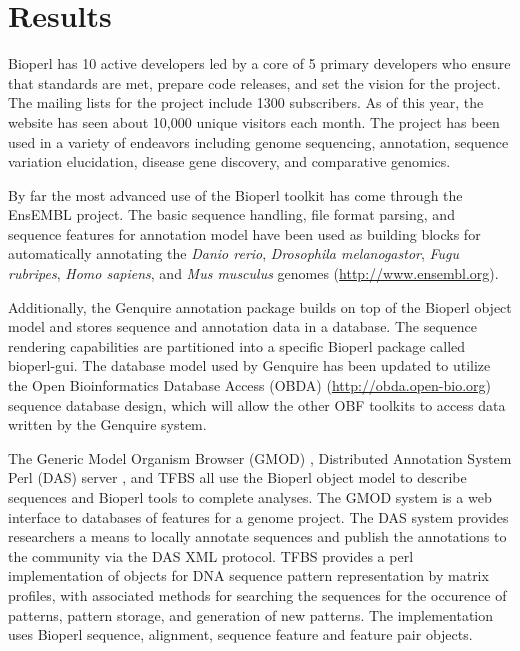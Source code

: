 \documentclass[12pt]{article}
\begin{document}
\section{Results}

Bioperl has 10 active developers led by a core of 5 primary developers
who ensure that standards are met, prepare code releases, and set the
vision for the project.  The mailing lists for the project include
1300 subscribers. As of this year, the website has seen about 10,000
unique visitors each month.  The project has been used in a variety of
endeavors including genome sequencing, annotation, sequence variation
elucidation, disease gene discovery, and comparative genomics.

By far the most advanced use of the Bioperl toolkit has come through
the EnsEMBL\cite{ensembl-nar} project.  The basic sequence handling,
file format parsing, and sequence features for annotation model have
been used as building blocks for automatically annotating the
\textit{Danio rerio}, \textit{Drosophila melanogastor}, \textit{Fugu
rubripes}, \textit{Homo sapiens}, and \textit{Mus musculus} genomes
(\url{http://www.ensembl.org}).

Additionally, the Genquire\cite{genquire} annotation package builds on
top of the Bioperl object model and stores sequence and annotation
data in a database.  The sequence rendering capabilities are
partitioned into a specific Bioperl package called bioperl-gui. 
The database model used by Genquire has been updated to utilize the
Open Bioinformatics Database Access (OBDA)
(\url{http://obda.open-bio.org}) sequence database design, which will
allow the other OBF toolkits to access data written by the Genquire
system.

The Generic Model Organism Browser (GMOD) \cite{gmod}, Distributed
Annotation System Perl (DAS) server \cite{das}, and TFBS
\cite{tfbs} all use the Bioperl object model to describe sequences and
Bioperl tools to complete analyses.  The GMOD system is a web
interface to databases of features for a genome project.  The DAS
system provides researchers a means to locally annotate sequences and
publish the annotations to the community via the DAS XML protocol.
TFBS provides a perl implementation of objects for DNA sequence pattern
representation by matrix profiles, with associated methods for searching
the sequences for the occurence of patterns, pattern storage, and
generation of new patterns. The implementation uses Bioperl sequence,
alignment, sequence feature and feature pair objects.
\end{document}
